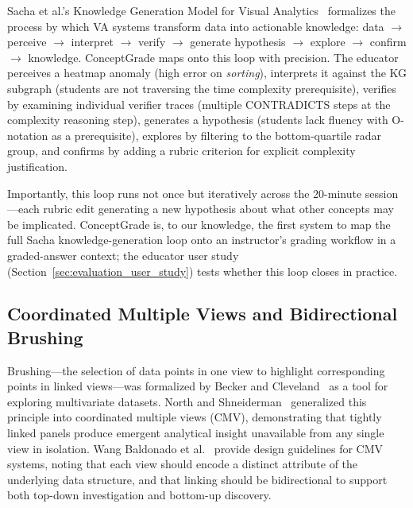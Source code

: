 \documentclass[journal,review]{vgtc}
\begin{document}
Sacha et al.'s Knowledge Generation Model for Visual Analytics~\cite{Sacha2014} formalizes the process by which VA systems transform data into actionable knowledge: data $\rightarrow$ perceive $\rightarrow$ interpret $\rightarrow$ verify $\rightarrow$ generate hypothesis $\rightarrow$ explore $\rightarrow$ confirm $\rightarrow$ knowledge. ConceptGrade maps onto this loop with precision. The educator perceives a heatmap anomaly (high error on \textit{sorting}), interprets it against the KG subgraph (students are not traversing the time complexity prerequisite), verifies by examining individual verifier traces (multiple CONTRADICTS steps at the complexity reasoning step), generates a hypothesis (students lack fluency with O-notation as a prerequisite), explores by filtering to the bottom-quartile radar group, and confirms by adding a rubric criterion for explicit complexity justification.

Importantly, this loop runs not once but iteratively across the 20-minute session---each rubric edit generating a new hypothesis about what other concepts may be implicated. ConceptGrade is, to our knowledge, the first system to map the full Sacha knowledge-generation loop onto an instructor's grading workflow in a graded-answer context; the educator user study (Section~\ref{sec:evaluation_user_study}) tests whether this loop closes in practice.

\subsection{Coordinated Multiple Views and Bidirectional Brushing}

Brushing---the selection of data points in one view to highlight corresponding points in linked views---was formalized by Becker and Cleveland~\cite{Becker1987} as a tool for exploring multivariate datasets. North and Shneiderman~\cite{North2000} generalized this principle into coordinated multiple views (CMV), demonstrating that tightly linked panels produce emergent analytical insight unavailable from any single view in isolation. Wang Baldonado et al.~\cite{Baldonado2000} provide design guidelines for CMV systems, noting that each view should encode a distinct attribute of the underlying data structure, and that linking should be bidirectional to support both top-down investigation and bottom-up discovery.
\end{document}
